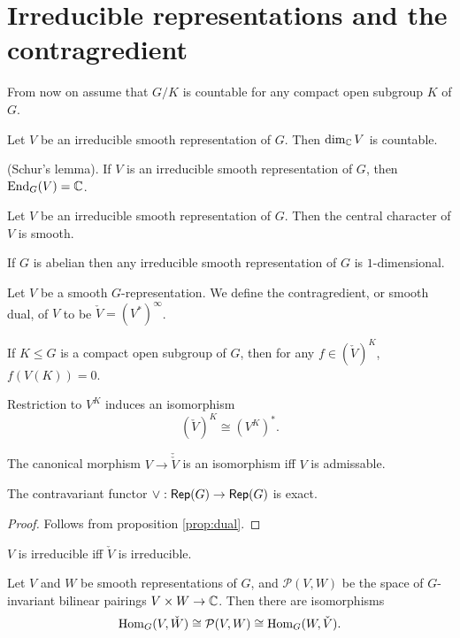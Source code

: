 \documentclass{memoir}
\begin{document}
\section{Irreducible representations and the contragredient}
\begin{remark}
    From now on assume that $G/K$ is countable for any compact open subgroup $K$ of $G$.
\end{remark}
\begin{lemma}
    Let $V$ be an irreducible smooth representation of $G$.
    Then $\dim_{\mathbb{C}} V$ is countable.
\end{lemma}
\begin{lemma}
    (Schur's lemma). If $V$ is an irreducible smooth representation of $G$, then $\operatorname{End}_G(V) = \mathbb{C}$.
\end{lemma}
\begin{corollary}
    Let $V$ be an irreducible smooth representation of $G$.
    Then the central character of $V$ is smooth.
\end{corollary}
\begin{corollary}
    If $G$ is abelian then any irreducible smooth representation of $G$ is $1$-dimensional.
\end{corollary}
\begin{definition}
    Let $V$ be a smooth $G$-representation.
    We define the contragredient, or smooth dual, of $V$ to be $\check V = (V^*)^\infty$.
\end{definition}
\begin{remark}
    If $K\le G$ is a compact open subgroup of $G$, then for any $f\in (\check V)^K$, $f(V(K)) = 0$.
\end{remark}
\begin{proposition}
    \label{prop:dual}
    Restriction to $V^K$ induces an isomorphism 
    \begin{equation}
        (\check V)^K \cong (V^K)^*.
    \end{equation}
\end{proposition}
\begin{thm}
    The canonical morphism $V\to \check{\check V}$ is an isomorphism iff $V$ is admissable.
\end{thm}
\begin{proposition}
    The contravariant functor $\vee:{\normalfont\mathsf{Rep}}(G) \to {\normalfont\mathsf{Rep}}(G)$ is exact.
\end{proposition}
\begin{proof}
    Follows from proposition \ref{prop:dual}.
\end{proof}
\begin{corollary}
    $V$ is irreducible iff $\check V$ is irreducible.
\end{corollary}
\begin{proposition}
    Let $V$ and $W$ be smooth representations of $G$, and $\mathcal P(V,W)$ be the space of $G$-invariant bilinear pairings $V\times W\to \mathbb{C}$.
    Then there are isomorphisms
    \begin{equation}
        \operatorname{Hom}_G(V,\check W) \cong \mathcal P(V,W) \cong \operatorname{Hom}_G(W,\check V).
    \end{equation}
\end{proposition}
\end{document}
